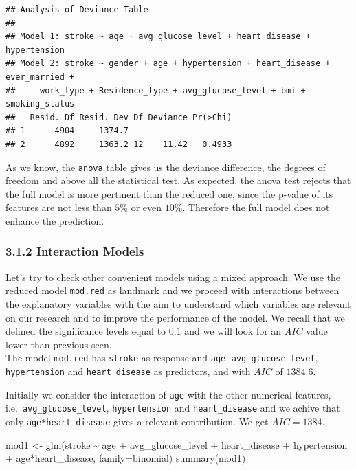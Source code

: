 \documentclass[
]{article}
\newenvironment{Shaded}{\begin{snugshade}}{\end{snugshade}}
\newcommand{\AttributeTok}[1]{\textcolor[rgb]{0.77,0.63,0.00}{#1}}
\newcommand{\FunctionTok}[1]{\textcolor[rgb]{0.00,0.00,0.00}{#1}}
\newcommand{\NormalTok}[1]{#1}
\newcommand{\OtherTok}[1]{\textcolor[rgb]{0.56,0.35,0.01}{#1}}
\newcommand{\SpecialCharTok}[1]{\textcolor[rgb]{0.00,0.00,0.00}{#1}}
\begin{document}
\begin{verbatim}
## Analysis of Deviance Table
## 
## Model 1: stroke ~ age + avg_glucose_level + heart_disease + hypertension
## Model 2: stroke ~ gender + age + hypertension + heart_disease + ever_married + 
##     work_type + Residence_type + avg_glucose_level + bmi + smoking_status
##   Resid. Df Resid. Dev Df Deviance Pr(>Chi)
## 1      4904     1374.7                     
## 2      4892     1363.2 12    11.42   0.4933
\end{verbatim}

As we know, the \texttt{anova} table gives us the deviance difference,
the degrees of freedom and above all the statistical test. As expected,
the anova test rejects that the full model is more pertinent than the
reduced one, since the p-value of its features are not less than \(5\%\)
or even \(10\%\). Therefore the full model does not enhance the
prediction.

\hypertarget{interaction-models}{%
\subsubsection{3.1.2 Interaction Models}\label{interaction-models}}

Let's try to check other convenient models using a mixed approach. We
use the reduced model \texttt{mod.red} as landmark and we proceed with
interactions between the explanatory variables with the aim to
understand which variables are relevant on our research and to improve
the performance of the model. We recall that we defined the significance levels equal to \(0.1\) and we will look for an \(AIC\) value lower than previous seen.\\
The model \texttt{mod.red} has \texttt{stroke} as response and
\texttt{age}, \texttt{avg\_glucose\_level}, \texttt{hypertension} and
\texttt{heart\_disease} as predictors, and with \(AIC\) of
\(1384.6\).

Initially we consider the interaction of \texttt{age} with the other
numerical features, i.e.~\texttt{avg\_glucose\_level},
\texttt{hypertension} and \texttt{heart\_disease} and we achive that
only \texttt{age*heart\_disease} gives a relevant contribution. We get
\(AIC = 1384\).

\begin{Shaded}
\begin{Highlighting}[]
\NormalTok{mod1 }\OtherTok{\textless{}{-}} \FunctionTok{glm}\NormalTok{(stroke }\SpecialCharTok{\textasciitilde{}}\NormalTok{ age }\SpecialCharTok{+}\NormalTok{ avg\_glucose\_level }\SpecialCharTok{+}\NormalTok{ heart\_disease }\SpecialCharTok{+}\NormalTok{ hypertension }\SpecialCharTok{+}
\NormalTok{               age}\SpecialCharTok{*}\NormalTok{heart\_disease, }\AttributeTok{family=}\NormalTok{binomial)}
\FunctionTok{summary}\NormalTok{(mod1)}
\end{Highlighting}
\end{Shaded}
\end{document}
